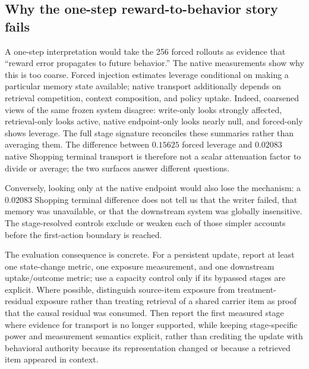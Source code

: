 \subsection{Why the one-step reward-to-behavior story fails}
A one-step interpretation would take the 256 forced rollouts as evidence that ``reward error propagates to future behavior.'' The native measurements show why this is too coarse. Forced injection estimates leverage conditional on making a particular memory state available; native transport additionally depends on retrieval competition, context composition, and policy uptake. Indeed, coarsened views of the same frozen system disagree: write-only looks strongly affected, retrieval-only looks active, native endpoint-only looks nearly null, and forced-only shows leverage. The full stage signature reconciles these summaries rather than averaging them. The difference between $0.15625$ forced leverage and $0.02083$ native Shopping terminal transport is therefore not a scalar attenuation factor to divide or average; the two surfaces answer different questions.

Conversely, looking only at the native endpoint would also lose the mechanism: a $0.02083$ Shopping terminal difference does not tell us that the writer failed, that memory was unavailable, or that the downstream system was globally insensitive. The stage-resolved controls exclude or weaken each of those simpler accounts before the first-action boundary is reached.

The evaluation consequence is concrete. For a persistent update, report at least one state-change metric, one exposure measurement, and one downstream uptake/outcome metric; use a capacity control only if its bypassed stages are explicit. Where possible, distinguish source-item exposure from treatment-residual exposure rather than treating retrieval of a shared carrier item as proof that the causal residual was consumed. Then report the first measured stage where evidence for transport is no longer supported, while keeping stage-specific power and measurement semantics explicit, rather than crediting the update with behavioral authority because its representation changed or because a retrieved item appeared in context.

